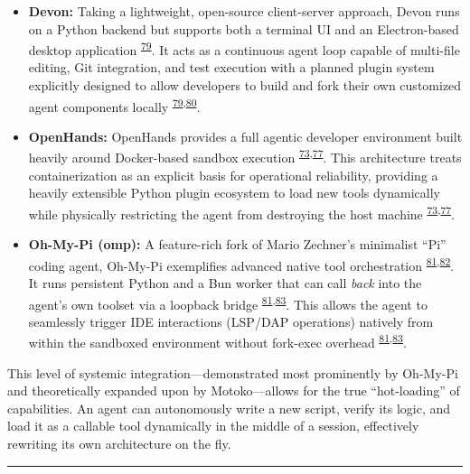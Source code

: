 \documentclass[
  11pt,
]{article}
\begin{document}
\begin{itemize}
  \textsuperscript{\protect\hyperlink{cite-76}{76},\protect\hyperlink{cite-77}{77},\protect\hyperlink{cite-78}{78}}.
\item
  \textbf{Devon:} Taking a lightweight, open-source client-server
  approach, Devon runs on a Python backend but supports both a terminal
  UI and an Electron-based desktop application
  \textsuperscript{\protect\hyperlink{cite-79}{79}}. It acts as a
  continuous agent loop capable of multi-file editing, Git integration,
  and test execution with a planned plugin system explicitly designed to
  allow developers to build and fork their own customized agent
  components locally
  \textsuperscript{\protect\hyperlink{cite-79}{79},\protect\hyperlink{cite-80}{80}}.
\item
  \textbf{OpenHands:} OpenHands provides a full agentic developer
  environment built heavily around Docker-based sandbox execution
  \textsuperscript{\protect\hyperlink{cite-73}{73},\protect\hyperlink{cite-77}{77}}.
  This architecture treats containerization as an explicit basis for
  operational reliability, providing a heavily extensible Python plugin
  ecosystem to load new tools dynamically while physically restricting
  the agent from destroying the host machine
  \textsuperscript{\protect\hyperlink{cite-73}{73},\protect\hyperlink{cite-77}{77}}.
\item
  \textbf{Oh-My-Pi (omp):} A feature-rich fork of Mario Zechner's
  minimalist ``Pi'' coding agent, Oh-My-Pi exemplifies advanced native
  tool orchestration
  \textsuperscript{\protect\hyperlink{cite-81}{81},\protect\hyperlink{cite-82}{82}}.
  It runs persistent Python and a Bun worker that can call \emph{back}
  into the agent's own toolset via a loopback bridge
  \textsuperscript{\protect\hyperlink{cite-81}{81},\protect\hyperlink{cite-83}{83}}.
  This allows the agent to seamlessly trigger IDE interactions (LSP/DAP
  operations) natively from within the sandboxed environment without
  fork-exec overhead
  \textsuperscript{\protect\hyperlink{cite-81}{81},\protect\hyperlink{cite-83}{83}}.
\end{itemize}

This level of systemic integration---demonstrated most prominently by
Oh-My-Pi and theoretically expanded upon by Motoko---allows for the true
``hot-loading'' of capabilities. An agent can autonomously write a new
script, verify its logic, and load it as a callable tool dynamically in
the middle of a session, effectively rewriting its own architecture on
the fly.

\begin{center}\rule{0.5\linewidth}{0.5pt}\end{center}
\end{document}
